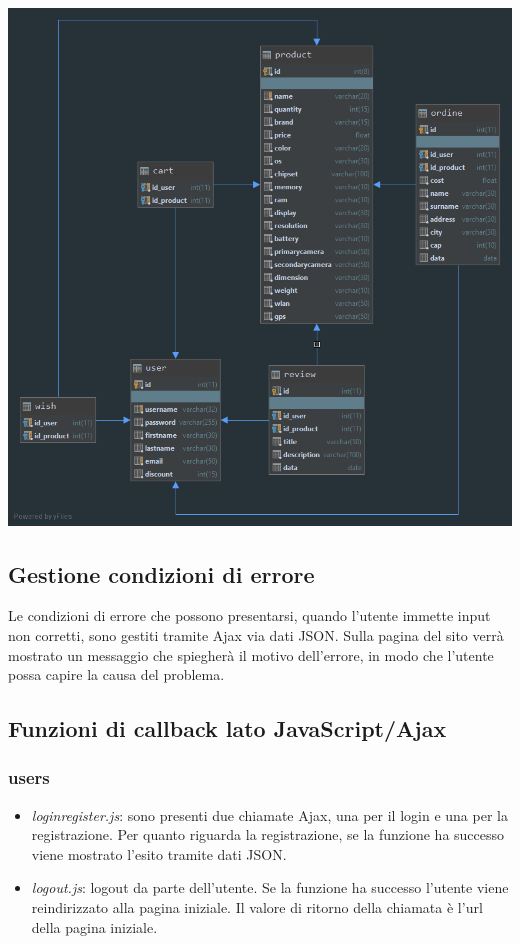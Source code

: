 \documentclass[14pt]{extarticle}
\begin{document}
\includegraphics[width=\linewidth]{diagram.png}

\subsection{Gestione condizioni di errore}
Le condizioni di errore che possono presentarsi, quando l'utente immette input non corretti, sono
gestiti tramite Ajax via dati JSON. Sulla pagina del sito verrà mostrato un messaggio che
spiegherà il motivo dell'errore, in modo che l'utente possa capire la causa del problema.

\subsection{Funzioni di callback lato JavaScript/Ajax}

\subsubsection*{users}
\begin{itemize}
    \item \textit{loginregister.js}: sono presenti due chiamate Ajax, una per il login e una per la registrazione.
    Per quanto riguarda la registrazione, se la funzione ha successo viene mostrato l'esito
    tramite dati JSON.
    \item \textit{logout.js}: logout da parte dell'utente. Se la funzione ha successo l'utente viene reindirizzato
    alla pagina iniziale. Il valore di ritorno della chiamata è l'url della pagina iniziale.
\end{itemize}
\end{document}
